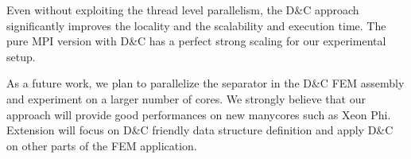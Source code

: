 \documentclass{IOS-Book-Article}
\begin{document}
Even without exploiting the thread level parallelism, the D\&C approach  significantly improves the locality and the scalability and execution time. The pure MPI version with D\&C has a perfect strong scaling for our experimental setup.

As a future work, we plan to parallelize the separator in the D\&C FEM assembly and experiment on a larger number of cores.
We strongly believe that our approach will provide good performances on new manycores such as Xeon Phi. Extension will focus on D\&C friendly data structure definition and apply D\&C on other parts of the FEM application. 


\end{document}
